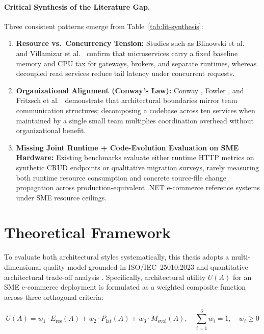 \paragraph{Critical Synthesis of the Literature Gap.}
Three consistent patterns emerge from Table~\ref{tab:lit-synthesis}:
\begin{enumerate}[leftmargin=1.5em]
  \item \textbf{Resource vs.\ Concurrency Tension:} Studies such as Blinowski et al.\ \cite{blinov2021} and Villamizar et al.\ \cite{villamizar2015} confirm that microservices carry a fixed baseline memory and CPU tax for gateways, brokers, and separate runtimes, whereas decoupled read services reduce tail latency under concurrent requests.
  \item \textbf{Organizational Alignment (Conway's Law):} Conway \cite{conway1968}, Fowler \cite{fowler2015monolith}, and Fritzsch et al.\ \cite{fritzsch2019} demonstrate that architectural boundaries mirror team communication structures; decomposing a codebase across ten services when maintained by a single small team multiplies coordination overhead without organizational benefit.
  \item \textbf{Missing Joint Runtime + Code-Evolution Evaluation on SME Hardware:} Existing benchmarks evaluate either runtime HTTP metrics on synthetic CRUD endpoints or qualitative migration surveys, rarely measuring both runtime resource consumption and concrete source-file change propagation across production-equivalent .NET e-commerce reference systems under SME resource ceilings.
\end{enumerate}

\section{Theoretical Framework}
\label{sec:theory}

To evaluate both architectural styles systematically, this thesis adopts a multi-dimensional quality model grounded in ISO/IEC~25010:2023 \cite{iso25010} and quantitative architectural trade-off analysis \cite{ford2022,kleppmann2017}. Specifically, architectural utility $U(A)$ for an SME e-commerce deployment is formulated as a weighted composite function across three orthogonal criteria:

\begin{equation}
\label{eq:tradeoff}
U(A) = w_1 \cdot E_{\text{res}}(A) + w_2 \cdot P_{\text{lat}}(A) + w_3 \cdot M_{\text{evol}}(A), \quad \sum_{i=1}^{3} w_i = 1, \quad w_i \ge 0
\end{equation}

